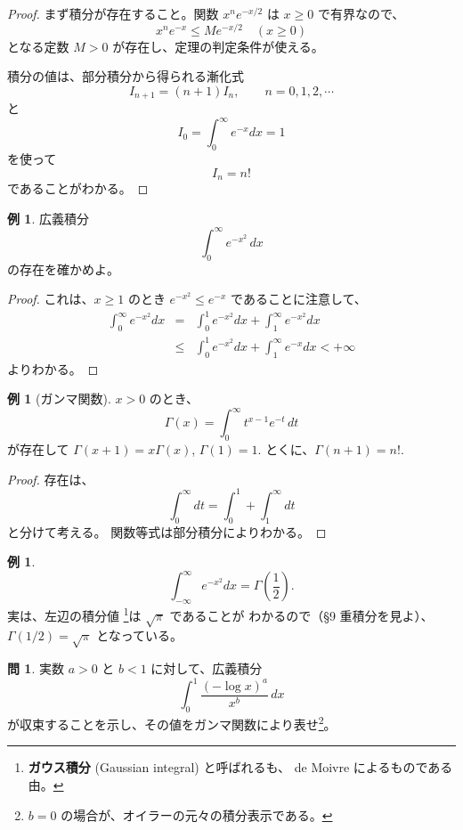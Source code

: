 \documentclass[a4paper]{jsarticle}
\theoremstyle{definition}
\newtheorem{Example}[Theorem]{例}
\newtheorem{Exercise}{問}%
\theoremstyle{remark}
\begin{document}
\begin{proof}
まず積分が存在すること。関数 $x^ne^{-x/2}$ は $x \geq 0$ で有界なので、
\[
x^n e^{-x} \leq M e^{-x/2}\quad(x \geq 0)
\]
となる定数 $M>0$ が存在し、定理の判定条件が使える。

積分の値は、部分積分から得られる漸化式
$$I_{n+1} = (n+1)I_n,\qquad n = 0, 1, 2, \cdots$$
と
\[
I_0 = \int_0^{\infty} e^{-x} dx = 1
\]
を使って
\[
I_n = n!
\]
であることがわかる。
\end{proof}
\par

\begin{Example} 広義積分
$$\int_0^\infty e^{-x^2}\,dx$$
の存在を確かめよ。
\end{Example}

\begin{proof}
これは、$x \geq 1$ のとき $e^{-x^2} \leq e^{-x}$ であることに注意して、
\begin{eqnarray*}
\int_0^\infty e^{-x^2} dx
&=& \int_0^1 e^{-x^2}dx + \int_1^\infty e^{-x^2}dx\\
&\leq& \int_0^1 e^{-x^2}dx + \int_1^\infty e^{-x} dx < +\infty
\end{eqnarray*}
よりわかる。
\end{proof}
\par

\begin{Example}[ガンマ関数]
$x>0$ のとき、
$$
\Gamma(x) = \int_0^{\infty} t^{x-1}e^{-t}\,dt
$$
が存在して
$\Gamma(x+1) = x\Gamma(x)$, $\Gamma(1) = 1$.
とくに、$\Gamma(n+1) = n!$.
\end{Example}

\begin{proof}
存在は、
\[
\int_0^\infty dt = \int_0^1 + \int_1^\infty dt
\]
と分けて考える。
関数等式は部分積分によりわかる。
\end{proof}

\begin{Example}
\[
\int_{-\infty}^\infty e^{-x^2}dx = 
\Gamma\left(\frac{1}{2}\right).
\]
実は、左辺の積分値
\footnote{{\bf ガウス積分} (Gaussian integral) と呼ばれるも、
de Moivre によるものである由。}は $\sqrt{\pi}$ であることが
わかるので（\S 9 重積分を見よ）、$\Gamma(1/2) = \sqrt{\pi}$ となっている。
\end{Example}

\begin{Exercise}
実数 $a>0$ と $b < 1$ に対して、広義積分
\[
\int_0^1 \frac{(-\log x)^a}{x^b} \, dx
\]
が収束することを示し、その値をガンマ関数により表せ\footnote{$b=0$ の場合が、オイラーの元々の積分表示である。}。
\end{Exercise}
\end{document}

